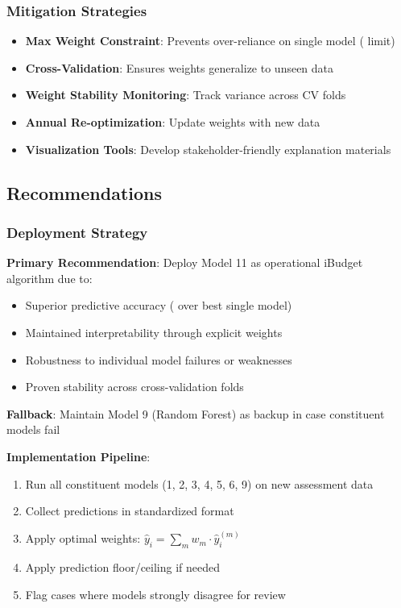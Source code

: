\subsubsection{Mitigation Strategies}

\begin{itemize}
    \item \textbf{Max Weight Constraint}: Prevents over-reliance on single model (\ModelElevenMaxWeight{} limit)
    \item \textbf{Cross-Validation}: Ensures weights generalize to unseen data
    \item \textbf{Weight Stability Monitoring}: Track variance across CV folds
    \item \textbf{Annual Re-optimization}: Update weights with new data
    \item \textbf{Visualization Tools}: Develop stakeholder-friendly explanation materials
\end{itemize}

\subsection{Recommendations}

\subsubsection{Deployment Strategy}

\textbf{Primary Recommendation}: Deploy Model 11 as operational iBudget algorithm due to:
\begin{itemize}
    \item Superior predictive accuracy (\ModelElevenImprovementVsBest{} over best single model)
    \item Maintained interpretability through explicit weights
    \item Robustness to individual model failures or weaknesses
    \item Proven stability across cross-validation folds
\end{itemize}

\textbf{Fallback}: Maintain Model 9 (Random Forest) as backup in case constituent models fail

\textbf{Implementation Pipeline}:
\begin{enumerate}
    \item Run all constituent models (1, 2, 3, 4, 5, 6, 9) on new assessment data
    \item Collect predictions in standardized format
    \item Apply optimal weights: $\hat{y}_i = \sum_m w_m \cdot \hat{y}_i^{(m)}$
    \item Apply prediction floor/ceiling if needed
    \item Flag cases where models strongly disagree for review
\end{enumerate}

